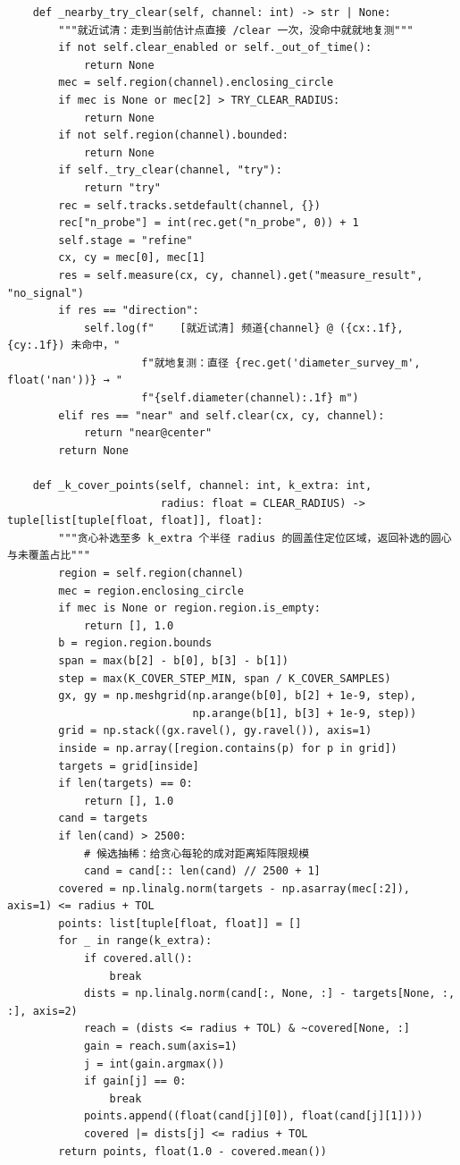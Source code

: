 \documentclass[UTF8, zihao=5,AutoFakeBold=2]{ctexart}
\begin{document}
\begin{lstlisting}
    def _nearby_try_clear(self, channel: int) -> str | None:
        """就近试清：走到当前估计点直接 /clear 一次，没命中就就地复测"""
        if not self.clear_enabled or self._out_of_time():
            return None
        mec = self.region(channel).enclosing_circle
        if mec is None or mec[2] > TRY_CLEAR_RADIUS:
            return None
        if not self.region(channel).bounded:
            return None
        if self._try_clear(channel, "try"):
            return "try"
        rec = self.tracks.setdefault(channel, {})
        rec["n_probe"] = int(rec.get("n_probe", 0)) + 1
        self.stage = "refine"
        cx, cy = mec[0], mec[1]
        res = self.measure(cx, cy, channel).get("measure_result", "no_signal")
        if res == "direction":
            self.log(f"    [就近试清] 频道{channel} @ ({cx:.1f}, {cy:.1f}) 未命中，"
                     f"就地复测：直径 {rec.get('diameter_survey_m', float('nan'))} → "
                     f"{self.diameter(channel):.1f} m")
        elif res == "near" and self.clear(cx, cy, channel):
            return "near@center"
        return None

    def _k_cover_points(self, channel: int, k_extra: int,
                        radius: float = CLEAR_RADIUS) -> tuple[list[tuple[float, float]], float]:
        """贪心补选至多 k_extra 个半径 radius 的圆盖住定位区域，返回补选的圆心与未覆盖占比"""
        region = self.region(channel)
        mec = region.enclosing_circle
        if mec is None or region.region.is_empty:
            return [], 1.0
        b = region.region.bounds
        span = max(b[2] - b[0], b[3] - b[1])
        step = max(K_COVER_STEP_MIN, span / K_COVER_SAMPLES)
        gx, gy = np.meshgrid(np.arange(b[0], b[2] + 1e-9, step),
                             np.arange(b[1], b[3] + 1e-9, step))
        grid = np.stack((gx.ravel(), gy.ravel()), axis=1)
        inside = np.array([region.contains(p) for p in grid])
        targets = grid[inside]
        if len(targets) == 0:
            return [], 1.0
        cand = targets
        if len(cand) > 2500:
            # 候选抽稀：给贪心每轮的成对距离矩阵限规模
            cand = cand[:: len(cand) // 2500 + 1]
        covered = np.linalg.norm(targets - np.asarray(mec[:2]), axis=1) <= radius + TOL
        points: list[tuple[float, float]] = []
        for _ in range(k_extra):
            if covered.all():
                break
            dists = np.linalg.norm(cand[:, None, :] - targets[None, :, :], axis=2)
            reach = (dists <= radius + TOL) & ~covered[None, :]
            gain = reach.sum(axis=1)
            j = int(gain.argmax())
            if gain[j] == 0:
                break
            points.append((float(cand[j][0]), float(cand[j][1])))
            covered |= dists[j] <= radius + TOL
        return points, float(1.0 - covered.mean())


\end{lstlisting}
\end{document}
